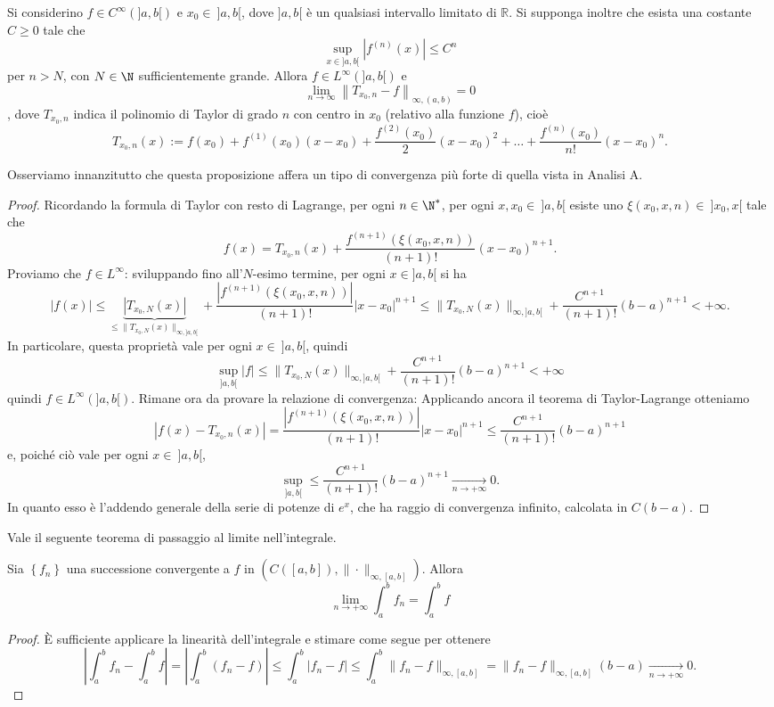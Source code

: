 \begin{proposition}[$*$]\label{prop: 4.4}
    Si considerino $f \in C^{\infty}(]a, b[)$ e $x_{0} \in\ ]a, b[$, dove $]a, b[$ è un qualsiasi intervallo limitato di $\mathbb{R}$. Si supponga inoltre che esista una costante $C \geq 0$ tale che
    \[\sup _{x \in]a, b[}\left|f^{(n)}(x)\right| \leq C^{n}\]
    per $n>N$, con $N\in \N$ sufficientemente grande. Allora $f \in L^{\infty}(]a, b[)$ e \[\lim _{n \to \infty}\left\|T_{x_{0}, n}-f\right\|_{\infty,(a, b)}=0\], dove $T_{x_{0}, n}$ indica il polinomio di Taylor di grado $n$ con centro in $x_{0}$ (relativo alla funzione $f$), cioè
    \[T_{x_{0}, n}(x):=f\left(x_{0}\right)+f^{(1)}\left(x_{0}\right)\left(x-x_{0}\right)+\frac{f^{(2)}\left(x_{0}\right)}{2}\left(x-x_{0}\right)^{2}+\ldots+\frac{f^{(n)}\left(x_{0}\right)}{n!}\left(x-x_{0}\right)^{n}.\]
\end{proposition}
Osserviamo innanzitutto che questa proposizione affera un tipo di convergenza più forte di quella vista in Analisi A.
\begin{proof}
    Ricordando la formula di Taylor con resto di Lagrange, per ogni $n\in \N^*$, per ogni $x,x_0\in\ ]a,b[$ esiste uno $\xi(x_0,x,n)\in\ ]x_0,x[$ tale che 
    \[f(x) = T_{x_0,n}(x)+\frac{f^{(n+1)}(\xi(x_0,x,n))}{(n+1)!}(x-x_0)^{n+1}.\] 
    Proviamo che $f\in L^\infty$: sviluppando fino all'$N$-esimo termine, per ogni $x\in ]a,b[$ si ha
    \[|f(x)|\leq \underbrace{|T_{x_0,N}(x)|}_{\leq\|T_{x_0,N}(x)\|_{\infty,]a,b[}}+\frac{|f^{(n+1)}(\xi(x_0,x,n))|}{(n+1)!}|x-x_0|^{n+1} \leq \|T_{x_0,N}(x)\|_{\infty,]a,b[}+\frac{C^{n+1}}{(n+1)!}(b-a)^{n+1}<+\infty.\] 
    In particolare, questa proprietà vale per ogni $x\in\ ]a,b[$, quindi 
    \[\sup_{]a,b[}|f| \leq \|T_{x_0,N}(x)\|_{\infty,]a,b[}+\frac{C^{n+1}}{(n+1)!}(b-a)^{n+1}<+\infty\]
    quindi $f\in L^{\infty}(]a,b[)$. Rimane ora da provare la relazione di convergenza: Applicando ancora il teorema di Taylor-Lagrange otteniamo 
    \[|f(x)-T_{x_0,n}(x)|= \frac{|f^{(n+1)}(\xi(x_0,x,n))|}{(n+1)!}|x-x_0|^{n+1} \leq\frac{C^{n+1}}{(n+1)!}(b-a)^{n+1}\]
    e, poiché ciò vale per ogni $x\in \ ]a,b[$,
    \[\sup_{]a,b[}\leq\frac{C^{n+1}}{(n+1)!}(b-a)^{n+1}\xrightarrow[n\to +\infty ]{}0.\]
    In quanto esso è l'addendo generale della serie di potenze di $e^{x}$, che ha raggio di convergenza infinito, calcolata in $C(b-a)$.
\end{proof}
Vale il seguente teorema di passaggio al limite nell'integrale.

\begin{proposition}[$*$]\label{prop: 4.5}
Sia $\left\{f_{n}\right\}$ una successione convergente a $f$ in $\left(C([a, b]),\|\cdot\|_{\infty,[a, b]}\right)$. Allora
\[\lim _{n \rightarrow+\infty} \int_{a}^{b} f_{n}=\int_{a}^{b} f\]
\end{proposition}
\begin{proof}
    È sufficiente applicare la linearità dell'integrale e stimare come segue per ottenere 
    \[\left|\int_a^bf_n-\int_a^bf\right| = \left|\int_a^b(f_n-f)\right|\leq \int_a^b|f_n-f| \leq \int_a^b\|f_n-f\|_{\infty,[a,b]} = \|f_n-f\|_{\infty,[a,b]}(b-a)\xrightarrow[n\to +\infty ]{}0.\]
\end{proof}

